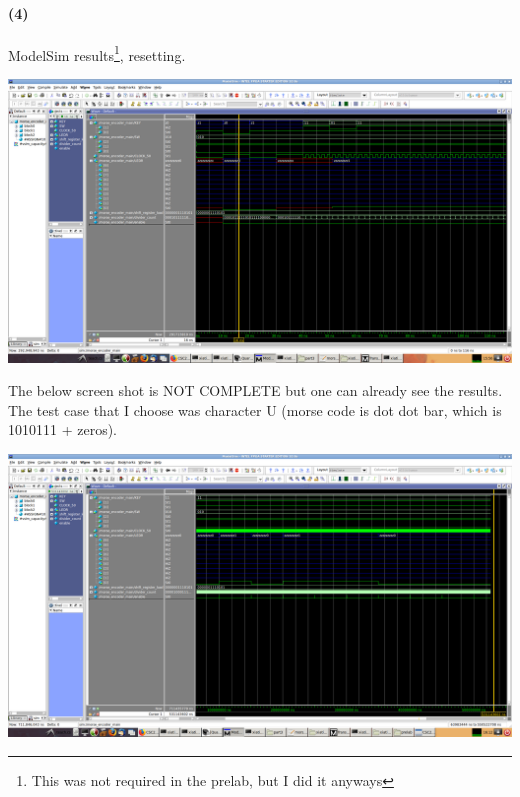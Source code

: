 \documentclass{article}
\begin{document}
\paragraph{(4)} ModelSim results\footnote{This was not required in the prelab, but I did it anyways}, resetting. 
\begin{center}
    \includegraphics[scale=0.25]{q3_init_reset.png}
\end{center}
The below screen shot is NOT COMPLETE but one can already see the results. The test case that I choose was character U (morse code is dot dot bar, which is 1010111 + zeros).
\begin{center}
    \includegraphics[scale=0.25]{q3_sim_u.png}
\end{center}
\end{document}
